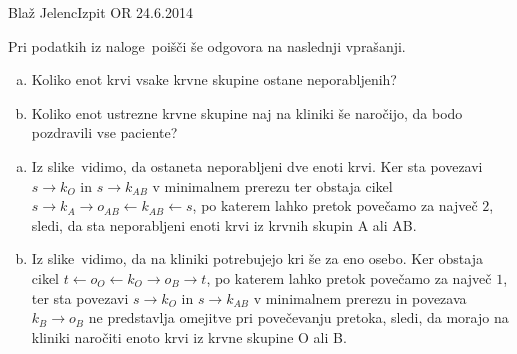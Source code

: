 \begin{naloga}{Blaž Jelenc}{Izpit OR 24.6.2014}
\begin{vprasanje}
Pri podatkih iz naloge~\nal[kri] poišči še odgovora na naslednji vprašanji.
\begin{enumerate}[(a)]
\item Koliko enot krvi vsake krvne skupine ostane neporabljenih?
\item Koliko enot ustrezne krvne skupine naj na kliniki še naročijo,
da bodo po\-zdra\-vi\-li vse paciente?
\end{enumerate}
\end{vprasanje}

\begin{odgovor}
\begin{enumerate}[(a)]
\item Iz slike~ vidimo,
da ostaneta neporabljeni dve enoti krvi.
Ker sta povezavi $s \to k_O$ in $s \to k_{AB}$ v minimalnem prerezu
ter obstaja cikel $s \to k_A \to o_{AB} \gets k_{AB} \gets s$,
po katerem lahko pretok povečamo za največ $2$,
sledi, da sta neporabljeni enoti krvi iz krvnih skupin A ali AB.

\item Iz slike~ vidimo,
da na kliniki potrebujejo kri še za eno osebo.
Ker obstaja cikel $t \gets o_O \gets k_O \to o_B \to t$,
po katerem lahko pretok povečamo za največ $1$,
ter sta povezavi $s \to k_O$ in $s \to k_{AB}$ v minimalnem prerezu
in povezava $k_B \to o_B$ ne predstavlja omejitve pri povečevanju pretoka,
sledi, da morajo na kliniki naročiti enoto krvi iz krvne skupine O ali B.
\end{enumerate}
\end{odgovor}
\end{naloga}
